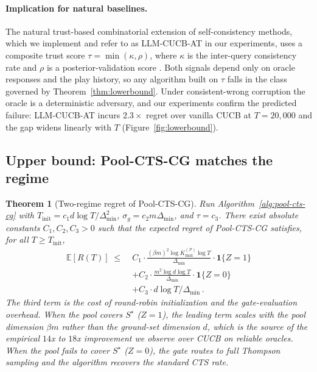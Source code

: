 \documentclass{article}
\theoremstyle{plain}
\newtheorem{theorem}{Theorem}
\theoremstyle{definition}
\theoremstyle{remark}
\newcommand{\E}{\mathbb{E}}
\newcommand{\Pool}{\mathcal{P}}
\newcommand{\opt}{S^{\star}}
\newcommand{\gap}{\Delta_{\min}}
\newcommand{\algname}{Pool-CTS-CG}
\begin{document}
\paragraph{Implication for natural baselines.} The natural trust-based combinatorial extension of self-consistency methods, which we implement and refer to as \textsc{LLM-CUCB-AT} in our experiments, uses a composite trust score $\tau = \min(\kappa, \rho)$, where $\kappa$ is the inter-query consistency rate and $\rho$ is a posterior-validation score \citep{krishnamurthy2024canllms,bayley2025jumpstart}. Both signals depend only on oracle responses and the play history, so any algorithm built on $\tau$ falls in the class governed by Theorem~\ref{thm:lowerbound}. Under consistent-wrong corruption the oracle is a deterministic adversary, and our experiments confirm the predicted failure: \textsc{LLM-CUCB-AT} incurs $2.3\times$ regret over vanilla CUCB at $T = 20{,}000$ and the gap widens linearly with $T$ (Figure~\ref{fig:lowerbound}).

\subsection{Upper bound: \algname{} matches the regime}

\begin{theorem}[Two-regime regret of \algname{}]
\label{thm:upper}
Run Algorithm~\ref{alg:pool-cts-cg} with $T_{\mathrm{init}} = c_1 d \log T / \gap^2$, $\sigma_g = c_2 m \gap$, and $\tau = c_3$. There exist absolute constants $C_1, C_2, C_3 > 0$ such that the expected regret of \algname{} satisfies, for all $T \geq T_{\mathrm{init}}$,
\begin{align*}
\E\!\left[R(T)\right] \;\leq\;& C_1 \cdot \tfrac{(\beta m)^2 \log K_{\max}^{(\Pool)} \log T}{\gap} \cdot \mathbf{1}\{Z=1\} \\
&+ C_2 \cdot \tfrac{m^2 \log d \log T}{\gap} \cdot \mathbf{1}\{Z=0\} \\
&+ C_3 \cdot d \log T / \gap \, .
\end{align*}
The third term is the cost of round-robin initialization and the gate-evaluation overhead. When the pool covers $\opt$ ($Z=1$), the leading term scales with the pool dimension $\beta m$ rather than the ground-set dimension $d$, which is the source of the empirical $14$x to $18$x improvement we observe over CUCB on reliable oracles. When the pool fails to cover $\opt$ ($Z=0$), the gate routes to full Thompson sampling and the algorithm recovers the standard CTS rate.
\end{theorem}
\end{document}
